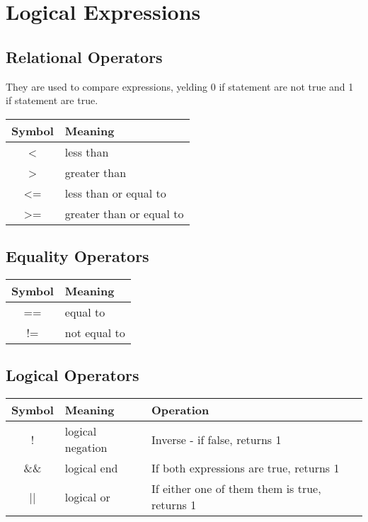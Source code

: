 \documentclass[openany]{book}
\begin{document}
    \section{Logical Expressions}
    \subsection*{Relational Operators}
    They are used to compare expressions, yelding 0 if statement are not true and 1 if
    statement are true.

    \bigskip
    \begin{tabular}{|@{} c l|}  %
        \hline
        \textbf{ Symbol} & \textbf{Meaning} \\
        \hline
        < & less than \\
        > & greater than \\
        <= & less than or equal to \\
        >= & greater than or equal to \\
        \hline
    \end{tabular} 

    \subsection*{Equality Operators}

    \bigskip
    \begin{tabular}{|@{} c l|}
        \hline
        \textbf{ Symbol} & \textbf{Meaning} \\
        \hline
        == & equal to \\
        != & not equal to \\
        \hline
    \end{tabular}

    \subsection*{Logical Operators}

    \bigskip
    \begin{tabular}{|@{} c l l|}
        \hline
        \textbf{ Symbol} & \textbf{Meaning} & \textbf{Operation} \\
        \hline
        ! & logical negation & Inverse - if false, returns 1\\
        \&\& & logical end & If both expressions are true, returns 1 \\
        || & logical or & If either one of them them is true, returns 1 \\ 
        \hline
    \end{tabular}
\end{document}
